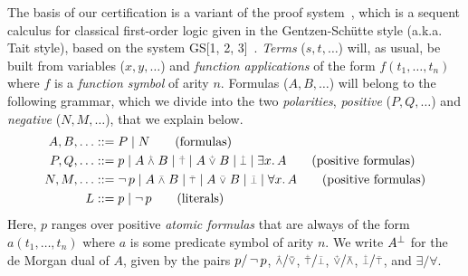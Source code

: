 \documentclass[a4paper,USenglish]{lipics-v2018}
\begin{document}
The basis of our certification is a variant of the \LKF proof
system~\cite{liang09tcs}, which is a sequent calculus for classical
first-order logic given in the Gentzen-Sch\"utte style (a.k.a. Tait
style), based on the system GS[1, 2, 3]~\cite{troelstra00book}.
%
\emph{Terms} ($s, t, \dotsc$) will, as usual, be built from variables
($x, y, \dotsc$) and \emph{function applications} of the form
$f(t_1, \dotsc, t_n)$ where $f$ is a \emph{function symbol} of arity
$n$.
%
Formulas ($A, B, \dotsc$) will belong to the following grammar, which
we divide into the two \emph{polarities}, \emph{positive}
($P, Q, \dotsc$) and \emph{negative} ($N, M, \dotsc$), that we explain
below.
%
\begin{align*}
  A, B, \dotsc &::= {
    P \mid N
  } \tag*{(formulas)} \\
  P, Q, \dotsc &::= {
    p \mid A \AND+ B \mid \TOP+ \mid A \OR+ B \mid \BOT+ \mid
    \EX x. A
  } \tag*{(positive formulas)} \\
  N, M, \dotsc &::= {
    \NEG p \mid A \AND- B \mid \TOP- \mid A \OR- B \mid \BOT- \mid
    \ALL x. A
  } \tag*{(positive formulas)} \\
  L &::= {
    p \mid \NEG p
  } \tag*{(literals)}
\end{align*}
%
Here, $p$ ranges over positive \emph{atomic formulas} that are always
of the form $a(t_1, \dotsc, t_n)$ where $a$ is some predicate symbol
of arity $n$.
%
We write ${A}^\perp$ for the de Morgan dual of $A$, given by the pairs
$p/\mathop{\lnot} p$, ${\AND+}/{\OR-}$, ${\TOP+}/{\BOT-}$, ${\OR+}/{\AND-}$,
${\BOT+}/{\TOP-}$, and ${\exists}/{\forall}$.

\lkfruleshere
\end{document}
